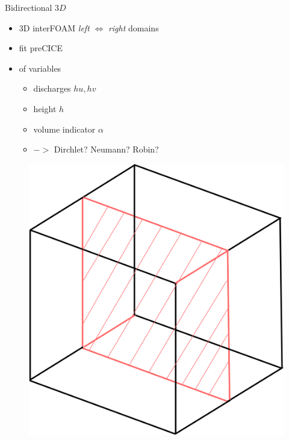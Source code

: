 \begin{frame}
\vspace{-2mm}
{\large Bidirectional $3D$}\\
\begin{multicols}{2}
\begin{itemize}
\setlength\itemsep{2em}
\item 3D interFOAM  \textit{left} $\Longleftrightarrow$ \textit{right} domains
\item fit  preCICE   
\item {} of variables
\begin{itemize}
\setlength\itemsep{1em}
\vspace{5pt}
\item discharges $hu, hv$
\item height $h$
\item volume indicator $\alpha$
\item {} $->$ Dirchlet? Neumann? Robin?
\end{itemize}
\end{itemize}

\vfill\columnbreak

\begin{figure}
\includegraphics[scale=0.5]{./Resources/Images/mapping33.png}
\end{figure}

\end{multicols}

\end{frame}



